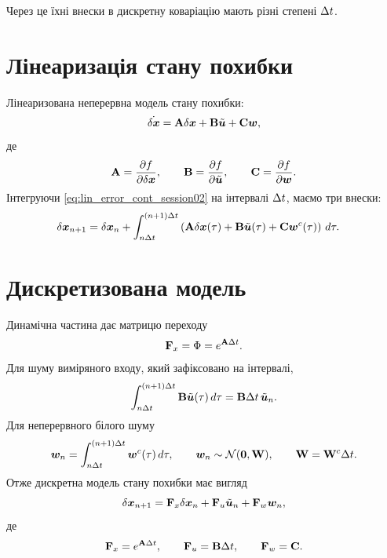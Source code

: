 Через це їхні внески в дискретну коваріацію мають різні степені $\Delta t$.

\section{Лінеаризація стану похибки}

Лінеаризована неперервна модель стану похибки:
\begin{equation}\label{eq:lin_error_cont_session02}
\dot{\delta\bm{x}}
=\mathbf{A}\delta\bm{x}+\mathbf{B}\tilde{\bm{u}}+\mathbf{C}\bm{w},
\end{equation}
де
\begin{equation}
\mathbf{A}=\frac{\partial f}{\partial \delta\bm{x}},\qquad
\mathbf{B}=\frac{\partial f}{\partial \tilde{\bm{u}}},\qquad
\mathbf{C}=\frac{\partial f}{\partial \bm{w}}.
\end{equation}
Інтегруючи \eqref{eq:lin_error_cont_session02} на інтервалі $\Delta t$, маємо три внески:
\begin{align}
\delta\bm{x}_{n+1}
&=\delta\bm{x}_n+
\int_{n\Delta t}^{(n+1)\Delta t}
\left(\mathbf{A}\delta\bm{x}(\tau)+\mathbf{B}\tilde{\bm{u}}(\tau)+\mathbf{C}\bm{w}^{c}(\tau)\right)\,d\tau.
\end{align}

\section{Дискретизована модель}

Динамічна частина дає матрицю переходу
\begin{equation}
\mathbf{F}_x=\Phi=e^{\mathbf{A}\Delta t}.
\end{equation}
Для шуму виміряного входу, який зафіксовано на інтервалі,
\begin{equation}
\int_{n\Delta t}^{(n+1)\Delta t}\mathbf{B}\tilde{\bm{u}}(\tau)\,d\tau
=\mathbf{B}\Delta t\,\tilde{\bm{u}}_n.
\end{equation}
Для неперервного білого шуму
\begin{equation}
\bm{w}_n=\int_{n\Delta t}^{(n+1)\Delta t}\bm{w}^{c}(\tau)\,d\tau,
\qquad
\bm{w}_n\sim\mathcal{N}(\bm{0},\mathbf{W}),
\qquad
\mathbf{W}=\mathbf{W}^{c}\Delta t.
\end{equation}
Отже дискретна модель стану похибки має вигляд
\begin{equation}\label{eq:disc_error_model_session02}
\delta\bm{x}_{n+1}
=\mathbf{F}_{x}\delta\bm{x}_{n}
+\mathbf{F}_{u}\tilde{\bm{u}}_n
+\mathbf{F}_{w}\bm{w}_n,
\end{equation}
де
\begin{equation}
\mathbf{F}_{x}=e^{\mathbf{A}\Delta t},\qquad
\mathbf{F}_{u}=\mathbf{B}\Delta t,
\qquad
\mathbf{F}_{w}=\mathbf{C}.
\end{equation}

